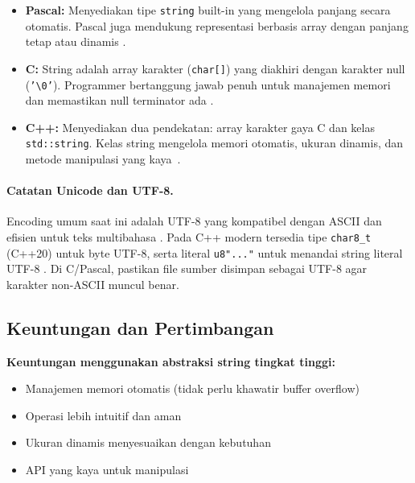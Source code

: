 \documentclass[../main.tex]{subfiles}
\begin{document}
\begin{itemize}
  \item \textbf{Pascal:} Menyediakan tipe \texttt{string} built-in yang mengelola panjang secara otomatis. Pascal juga mendukung representasi berbasis array dengan panjang tetap atau dinamis \parencite{pascal-tutorial-wikibooks,free-pascal-docs}.
  
  \item \textbf{C:} String adalah array karakter (\texttt{char[]}) yang diakhiri dengan karakter null (\texttt{'\textbackslash 0'}). Programmer bertanggung jawab penuh untuk manajemen memori dan memastikan null terminator ada \parencite{iso-c-draft-n1570,c-strings-h,tutorialspoint-c-strings}.
  
  \item \textbf{C++:} Menyediakan dua pendekatan: array karakter gaya C dan kelas \texttt{std::\allowbreak string}. Kelas string mengelola memori otomatis, ukuran dinamis, dan metode manipulasi yang kaya~\parencite{cpp-strings,cplusplus-string,yuliaagustin-string-cpp}.
\end{itemize}

\paragraph{Catatan Unicode dan UTF-8.} Encoding umum saat ini adalah UTF-8 yang kompatibel dengan ASCII dan efisien untuk teks multibahasa \parencite{rfc3629,utf8-everywhere}. Pada C++ modern tersedia tipe \texttt{char8\_t} (C++20) untuk byte UTF-8, serta literal \texttt{u8"..."} untuk menandai string literal UTF-8 \parencite{cpp-char8,cpp-string-literals}. Di C/Pascal, pastikan file sumber disimpan sebagai UTF-8 agar karakter non-ASCII muncul benar.

\subsection{Keuntungan dan Pertimbangan}

\textbf{Keuntungan menggunakan abstraksi string tingkat tinggi:}
\begin{itemize}
  \item Manajemen memori otomatis (tidak perlu khawatir buffer overflow)
  \item Operasi lebih intuitif dan aman
  \item Ukuran dinamis menyesuaikan dengan kebutuhan
  \item API yang kaya untuk manipulasi
\end{itemize}
\end{document}

